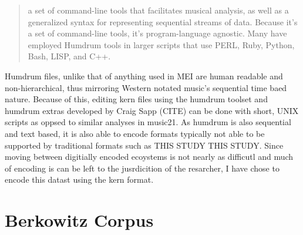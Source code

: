 \documentclass[]{book}
\begin{document}
\begin{quote}
a set of command-line tools that facilitates musical analysis, as well as a generalized syntax for representing sequential streams of data. Because it's a set of command-line tools, it's program-language agnostic. Many have employed Humdrum tools in larger scripts that use PERL, Ruby, Python, Bash, LISP, and C++.
\end{quote}

Humdrum files, unlike that of anything used in MEI are human readable and non-hierarchical, thus mirroring Western notated music's sequential time baed nature.
Because of this, editing kern files using the humdrum toolset and humdrum extras developed by Craig Sapp (CITE) can be done with short, UNIX scripts as oppsed to similar analyses in music21.
As humdrum is also sequential and text based, it is also able to encode formats typically not able to be supported by traditional formats such as THIS STUDY THIS STUDY.
Since moving between digitially encoded ecoystems is not nearly as difficutl and much of encoding is can be left to the jusrdicition of the resarcher, I have chose to encode this datast using the kern format.

\hypertarget{berkowitz-corpus}{%
\section{Berkowitz Corpus}\label{berkowitz-corpus}}
\end{document}
